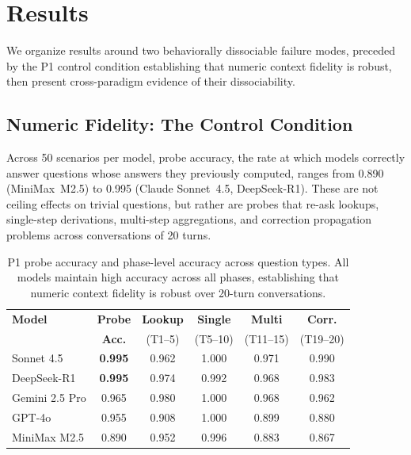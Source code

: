\documentclass[11pt,a4paper]{article}
\begin{document}
\section{Results}
\label{sec:results}

We organize results around two behaviorally dissociable failure modes, preceded by the P1 control condition establishing that numeric context fidelity is robust, then present cross-paradigm evidence of their dissociability.

\subsection{Numeric Fidelity: The Control Condition}
\label{sec:numeric}

Across 50 scenarios per model, probe accuracy, the rate at which models correctly answer questions whose answers they previously computed, ranges from 0.890 (MiniMax~M2.5) to 0.995 (Claude Sonnet~4.5, DeepSeek-R1). These are not ceiling effects on trivial questions, but rather are probes that re-ask lookups, single-step derivations, multi-step aggregations, and correction propagation problems across conversations of 20 turns.

\begin{table}[tbp]
\centering
\caption{P1 probe accuracy and phase-level accuracy across question types. All models maintain high accuracy across all phases, establishing that numeric context fidelity is robust over 20-turn conversations.}
\label{tab:p1-accuracy}
\small
\begin{tabular}{lccccc}
\toprule
\textbf{Model} & \textbf{Probe} & \textbf{Lookup} & \textbf{Single} & \textbf{Multi} & \textbf{Corr.} \\
 & \textbf{Acc.} & (T1--5) & (T5--10) & (T11--15) & (T19--20) \\
\midrule
Sonnet 4.5      & \textbf{0.995} & 0.962 & 1.000 & 0.971 & 0.990 \\
DeepSeek-R1     & \textbf{0.995} & 0.974 & 0.992 & 0.968 & 0.983 \\
Gemini 2.5 Pro  & 0.965          & 0.980 & 1.000 & 0.968 & 0.962 \\
GPT-4o          & 0.955          & 0.908 & 1.000 & 0.899 & 0.880 \\
MiniMax M2.5    & 0.890          & 0.952 & 0.996 & 0.883 & 0.867 \\
\bottomrule
\end{tabular}
\end{table}
\end{document}
